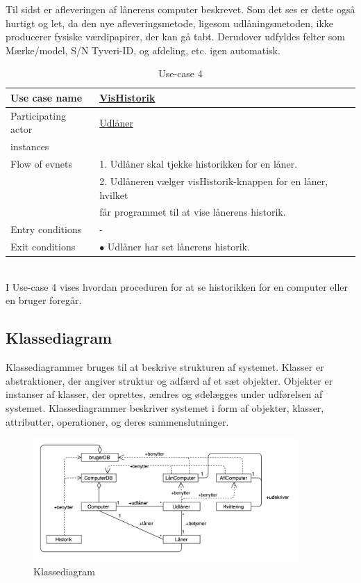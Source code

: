 \documentclass[a4paper]{article}
\begin{document}
Til sidst er afleveringen af lånerens computer beskrevet. Som det ses er dette også hurtigt og let, da den nye afleveringsmetode, ligesom udlåningsmetoden, ikke producerer fysiske værdipapirer, der kan gå tabt. Derudover udfyldes felter som Mærke/model, S/N Tyveri-ID, og afdeling, etc. igen automatisk. \\
\begin{table}[h]
\caption{Use-case 4}
\begin{tabular}{ll}
Use case name               & \underline{VisHistorik} \\ \hline
Participating actor           & \underline{Udlåner} \\
instances\\ \hline
Flow of evnets                & 1. Udlåner skal tjekke historikken for en låner.
                            \\& 2. Udlåneren vælger visHistorik-knappen for en låner, hvilket
                            \\& får programmet til at vise lånerens historik.  \\ \hline
Entry conditions & - \\ \hline
Exit conditions  & $\bullet$ Udlåner har set lånerens historik.
\end{tabular}
\end{table}\\
I Use-case 4 vises hvordan proceduren for at se historikken for en computer eller en bruger foregår.
\newpage
\subsection{Klassediagram}
Klassediagrammer bruges til at beskrive strukturen af systemet. Klasser er abstraktioner, der angiver struktur og adfærd af et sæt objekter. Objekter er instanser af klasser, der oprettes, ændres og ødelægges under udførelsen af systemet. Klassediagrammer beskriver systemet i form af objekter, klasser, attributter, operationer, og deres sammenslutninger. \cite[p~30]{OOSE}
\begin{figure}[h!]
\includegraphics[width=0.9\textwidth]{Klassediagram}
  \caption{Klassediagram}
  \centering
\end{figure}
\newpage
\end{document}
